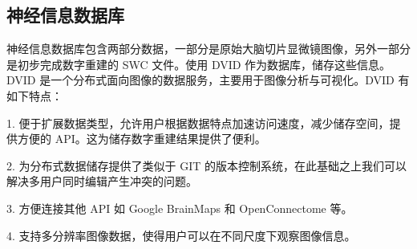 \subsection{神经信息数据库}
神经信息数据库包含两部分数据，一部分是原始大脑切片显微镜图像，另外一部分是初步完成数字重建的 SWC 文件。使用 DVID 作为数据库，储存这些信息。DVID 是一个分布式面向图像的数据服务，主要用于图像分析与可视化。DVID 有如下特点：

1. 便于扩展数据类型，允许用户根据数据特点加速访问速度，减少储存空间，提供方便的 API。这为储存数字重建结果提供了便利。

2. 为分布式数据储存提供了类似于 GIT 的版本控制系统，在此基础之上我们可以解决多用户同时编辑产生冲突的问题。

3. 方便连接其他 API 如 Google BrainMaps 和 OpenConnectome 等。

4. 支持多分辨率图像数据，使得用户可以在不同尺度下观察图像信息。




{
\renewcommand{\chapter}[2]{\section*{#2}\addcontentsline{toc}{section}{#2}}

}